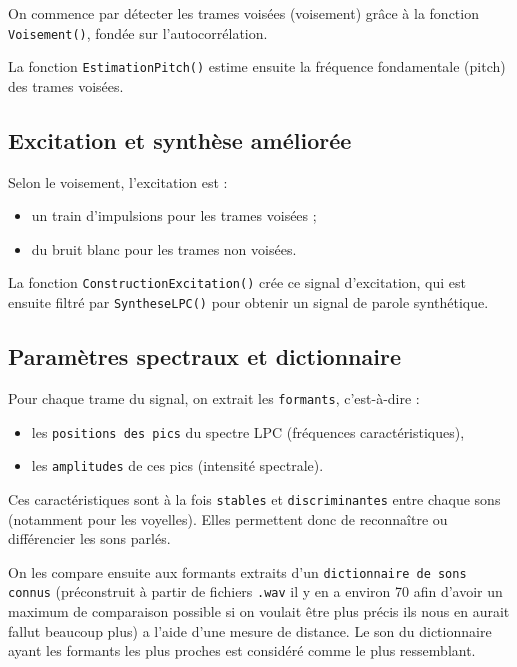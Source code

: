 \documentclass[11pt]{article}
\begin{document}
On commence par détecter les trames voisées (voisement) grâce à la fonction \texttt{Voisement()}, fondée sur l’autocorrélation.

La fonction \texttt{EstimationPitch()} estime ensuite la fréquence fondamentale (pitch) des trames voisées.

\subsection{Excitation et synthèse améliorée}

Selon le voisement, l’excitation est :
\begin{itemize}
    \item un train d’impulsions pour les trames voisées ;
    \item du bruit blanc pour les trames non voisées.
\end{itemize}

La fonction \texttt{ConstructionExcitation()} crée ce signal d’excitation, qui est ensuite filtré par \texttt{SyntheseLPC()} pour obtenir un signal de parole synthétique.

\subsection{Paramètres spectraux et dictionnaire}

Pour chaque trame du signal, on extrait les \texttt{formants}, c’est-à-dire :
\begin{itemize}
\item les 	\texttt{positions des pics} du spectre LPC (fréquences caractéristiques),
\item les \texttt{amplitudes} de ces pics (intensité spectrale).
\end{itemize}

Ces caractéristiques sont à la fois \texttt{stables} et 	\texttt{discriminantes} entre chaque sons (notamment pour les voyelles). Elles permettent donc de reconnaître ou différencier les sons parlés.\newline

On les compare ensuite aux formants extraits d’un \texttt{dictionnaire de sons connus} (préconstruit à partir de fichiers \texttt{.wav} il y en a environ 70 afin d'avoir un maximum de comparaison possible si on voulait être plus précis ils nous en aurait fallut beaucoup plus) a l'aide d'une mesure de distance. Le son du dictionnaire ayant les formants les plus proches est considéré comme le plus ressemblant. \newline
\\
\end{document}

